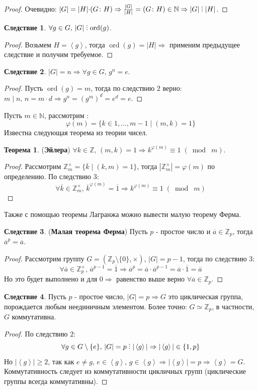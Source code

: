 \documentclass[12pt]{article}
\newcommand{\MN}{\mathbb{N}}
\newcommand{\MZ}{\mathbb{Z}}
\theoremstyle{definition}
\newtheorem{theorem}{Теорема}
\newtheorem{corollary}{Следствие}
\DeclareRobustCommand{\divby}{%
	\mathrel{\text{\vbox{\baselineskip.65ex\lineskiplimit0pt\hbox{.}\hbox{.}\hbox{.}}}}%
}
\newcommand{\linsp}[1]{\left\langle #1 \right\rangle }
\newcommand{\ovl}[1]{\overline{#1}}
\DeclareMathOperator\ord{ord}
\newcommand{\modn}[3]{#1 \equiv #2 \; (\bmod \; #3)}
\begin{document}
\begin{proof}
	Очевидно: $|G| = |H|{\cdot}(G \colon H) \Rightarrow \tfrac{|G|}{|H|} = (G \colon H) \in \MN \Rightarrow |G| \divby |H|$.
\end{proof}
\begin{corollary}
	$\forall g \in G,\, |G| \divby \ord(g)$.
\end{corollary}
\begin{proof}
	Возьмем $H = \linsp{g}$, тогда $\ord(g) = |H| \Rightarrow$ применим предыдущее следствие и получим требуемое. 
\end{proof}
\begin{corollary}
	$|G| = n \Rightarrow \forall g \in G, \, g^n = e$.
\end{corollary}
\begin{proof}
	Пусть $\ord(g) = m$, тогда по следствию $2$ верно: $m \mid n, \, n = m{\cdot}d \Rightarrow g^n = (g^m)^d = e^d = e$.
\end{proof}

Пусть $m \in \MN$, рассмотрим : 
$$
	\varphi(m) = \{k \in 1,\dotsc, m-1 \mid (m,k) = 1\}
$$ 
Известна следующая теорема из теории чисел.
\begin{theorem}(\textbf{Эйлера})
	$\forall k \in \MZ, \, (m,k) = 1 \Rightarrow \modn{k^{\varphi(m)}}{1}{m}$.
\end{theorem}
\begin{proof}
	Рассмотрим $\MZ_m^{\times} = \{\ovl{k} \mid (k,m) = 1\}$, тогда $|\MZ_m^{\times}| = \varphi(m)$ по определению. По следствию $3$:
	$$
		\forall \ovl{k}\in \MZ_m^{\times}, \, \ovl{k}^{\varphi(m)} = \ovl{1} \Rightarrow \modn{k^{\varphi(m)}}{1}{m}
	$$
\end{proof}

Также с помощью теоремы Лагранжа можно вывести малую теорему Ферма.
\begin{corollary}(\textbf{Малая теорема Ферма})
	Пусть $p$ - простое число и $\ovl{a} \in \MZ_p$, тогда $\ovl{a}^p = \ovl{a}$.
\end{corollary}
\begin{proof}
	Рассмотрим группу $G = (\MZ_p \setminus \{0\}, \times), \, |G| = p - 1$, тогда по следствию $3$:
	$$
		\forall \ovl{a} \in \MZ_p^\times, \, \ovl{a}^{p-1} = \ovl{1} \Rightarrow \ovl{a}^p = \ovl{a}{\cdot}\ovl{a}^{p-1} = \ovl{a}{\cdot}\ovl{1} = \ovl{a}
	$$
	Но это будет выполнено и для $0 \Rightarrow$ равенство выше верно $\forall \ovl{a} \in \MZ_p$.
\end{proof}

\begin{corollary}
	Пусть $p$ - простое число, $|G| = p \Rightarrow G$ это циклическая группа, порождается любым неединичным элементом. Более точно: $G\simeq \MZ_p$, в частности, $G$ коммутативна. 
\end{corollary}
\begin{proof}
	По следствию $2$:
	$$
		\forall g \in G \setminus \{e\}, \,  |G| = p \divby |\linsp{g}| \Rightarrow |\linsp{g}| \in \{1,p\}
	$$ 
	Но $|\linsp{g}| \geq 2$, так как $e \neq g, \, e \in \linsp{g}, \, g \in \linsp{g} \Rightarrow |\linsp{g}| = p\Rightarrow \linsp{g} = G$. Коммутативность следует из коммутативности цикличных групп (циклические группы всегда коммутативны).
\end{proof}
\end{document}
